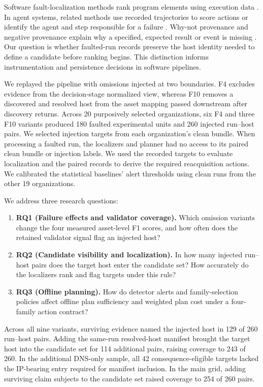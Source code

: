 \documentclass[sn-basic]{sn-jnl}%
\theoremstyle{thmstyleone}%
\theoremstyle{thmstyletwo}%
\theoremstyle{thmstylethree}%
\begin{document}
Software fault-localization methods rank program elements using execution data \citep{wong2016flsurvey}. In agent systems, related methods use recorded trajectories to score actions or identify the agent and step responsible for a failure \citep{famas,whowhen2025}. Why-not provenance and negative provenance explain why a specified, expected result or event is missing \citep{chapman2009whynot,herschel2010spjua,wu2014negativeprovenance}. Our question is whether faulted-run records preserve the host identity needed to define a candidate before ranking begins. This distinction informs instrumentation and persistence decisions in software pipelines.

We replayed the pipeline with omissions injected at two boundaries. F4 excludes evidence from the decision-stage normalized view, whereas F10 removes a discovered and resolved host from the asset mapping passed downstream after discovery returns. Across 20 purposively selected organizations, six F4 and three F10 variants produced 180 faulted experimental units and 260 injected run--host pairs. We selected injection targets from each organization's clean bundle. When processing a faulted run, the localizers and planner had no access to its paired clean bundle or injection labels. We used the recorded targets to evaluate localization and the paired records to derive the required reacquisition actions. We calibrated the statistical baselines' alert thresholds using clean runs from the other 19 organizations.

We address three research questions:
\begin{enumerate}
    \item \textbf{RQ1 (Failure effects and validator coverage).} Which omission variants change the four measured asset-level F1 scores, and how often does the retained validator signal flag an injected host?
    \item \textbf{RQ2 (Candidate visibility and localization).} In how many injected run--host pairs does the target host enter the candidate set? How accurately do the localizers rank and flag targets under this rule?
    \item \textbf{RQ3 (Offline planning).} How do detector alerts and family-selection policies affect offline plan sufficiency and weighted plan cost under a four-family action contract?
\end{enumerate}

Across all nine variants, surviving evidence named the injected host in 129 of 260 run--host pairs. Adding the same-run resolved-host manifest brought the target host into the candidate set for 114 additional pairs, raising coverage to 243 of 260. In the additional DNS-only sample, all 42 consequence-eligible targets lacked the IP-bearing entry required for manifest inclusion. In the main grid, adding surviving claim subjects to the candidate set raised coverage to 254 of 260 pairs.
\end{document}
